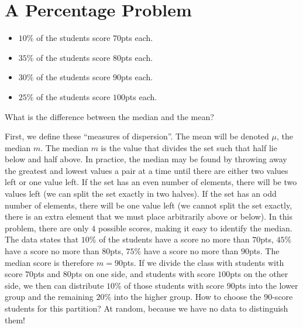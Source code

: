 \documentclass[12pt]{article}
\newenvironment{answer}{\vspace{1em}\color{blue!90!black}}{}
\newenvironment{answer}{\vspace{0em}\expandafter\comment}{\expandafter\endcomment}
\begin{document}
\section{A Percentage Problem}
\begin{itemize}
\item $10\%$ of the students score $70$pts each. 
\item $35\%$ of the students score $80$pts each. 
\item $30\%$ of the students score $90$pts each. 
\item $25\%$ of the students score $100$pts each. 
\end{itemize}
What is the difference between the median and the mean?

\begin{answer}
First, we define these ``measures of dispersion''. The mean will be denoted $\mu$, the median $m$. 
The median $m$ is the value that divides the set such that half lie below and half above. In practice, the median may be found by throwing away the greatest and lowest values a pair at a time until there are either two values left or one value left. If the set has an even number of elements, there will be two values left (we can split the set exactly in two halves). If the set has an odd number of elements, there will be one value left (we cannot split the set exactly, there is an extra element that we must place arbitrarily above or below). In this problem, there are only $4$ possible scores, making it easy to identify the median. The data states that $10\%$ of the students have a score no more than $70$pts, $45\%$ have a score no more than $80$pts, $75\%$ have a score no more than $90$pts. The median score is therefore $m=90$pts. If we divide the class with students with score $70$pts and $80$pts on one side, and students with score $100$pts on the other side, we then can distribute $10\%$ of those students with score $90$pts into the lower group and the remaining $20\%$ into the higher group. How to choose the $90$-score students for this partition? At random, because we have no data to distinguish them! 


\end{answer}
\end{document}
